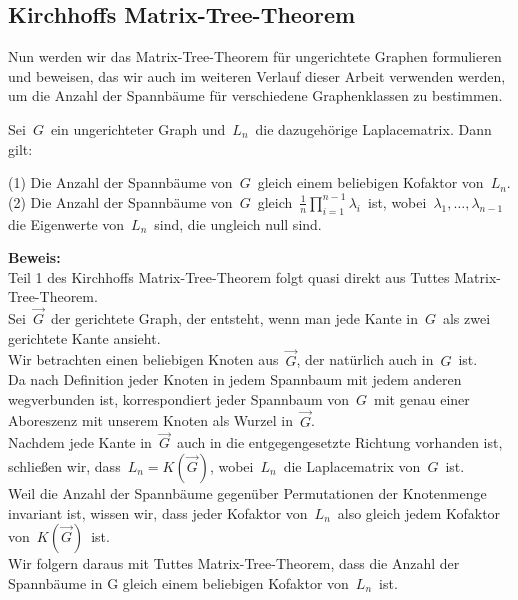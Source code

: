 \subsection{Kirchhoffs Matrix-Tree-Theorem}
Nun werden wir das Matrix-Tree-Theorem für ungerichtete Graphen formulieren und beweisen, das wir auch im weiteren Verlauf dieser Arbeit verwenden werden, um die Anzahl der Spannbäume für verschiedene Graphenklassen zu bestimmen.
\begin{Tms}
Sei $\,G\,$ ein ungerichteter Graph und $\,L_n\,$  die dazugehörige Laplacematrix. 
Dann gilt:
\par
\begingroup
\leftskip=20pt%
\rightskip=20pt
\noindent %
(1) Die Anzahl der Spannbäume von $\,G\,$ gleich einem beliebigen Kofaktor von $\,L_n$.\; \\
(2) Die Anzahl der Spannbäume von $\,G\,$ gleich $\,\frac{1}{n}\prod_{i=1}^{n-1}\lambda_i\,$ ist, wobei $\,\lambda_1,\ldots,\lambda_{n-1}\,$ die Eigenwerte von $\,L_n\,$ sind, die ungleich null sind.
\par
\endgroup
\end{Tms}
\textbf{Beweis:}\\
Teil 1 des Kirchhoffs Matrix-Tree-Theorem folgt quasi direkt aus Tuttes Matrix-Tree-Theorem. \\
Sei $\,\vec{G}\,$ der gerichtete Graph, der entsteht, wenn man jede Kante in $\,G\,$ als zwei gerichtete Kante ansieht.\\
Wir betrachten einen beliebigen Knoten aus $\,\vec{G}$,\; der natürlich auch in $\,G\,$ ist. \\
Da nach Definition jeder Knoten in jedem Spannbaum mit jedem anderen wegverbunden ist, korrespondiert jeder Spannbaum von $\,G\,$ mit genau einer Aboreszenz mit unserem Knoten als Wurzel in $\,\vec{G}$.\;  \\
Nachdem jede Kante in $\,\vec{G}\,$ auch in die entgegengesetzte Richtung vorhanden ist, schließen wir, dass $\,L_n=K(\vec{G})$,\; wobei $\,L_n\,$ die Laplacematrix von $\,G\,$ ist. \\
Weil die Anzahl der Spannbäume gegenüber Permutationen der Knotenmenge invariant ist, wissen wir, dass jeder Kofaktor von $\,L_n\,$ also gleich jedem Kofaktor von $\,K(\vec{G})\,$ ist.\\
Wir folgern daraus mit Tuttes Matrix-Tree-Theorem, dass die Anzahl der Spannbäume in G gleich einem beliebigen Kofaktor von $\,L_n\,$ ist.\\ \\
